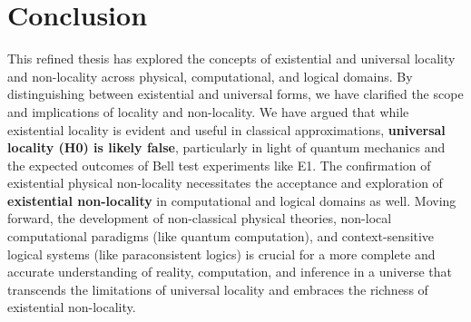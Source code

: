 	\section{Conclusion}
	
	This refined thesis has explored the concepts of existential and universal locality and non-locality across physical, computational, and logical domains. By distinguishing between existential and universal forms, we have clarified the scope and implications of locality and non-locality. We have argued that while existential locality is evident and useful in classical approximations, \textbf{universal locality (H0) is likely false}, particularly in light of quantum mechanics and the expected outcomes of Bell test experiments like E1.  The confirmation of existential physical non-locality necessitates the acceptance and exploration of \textbf{existential non-locality} in computational and logical domains as well.  Moving forward, the development of non-classical physical theories, non-local computational paradigms (like quantum computation), and context-sensitive logical systems (like paraconsistent logics) is crucial for a more complete and accurate understanding of reality, computation, and inference in a universe that transcends the limitations of universal locality and embraces the richness of existential non-locality.
	
